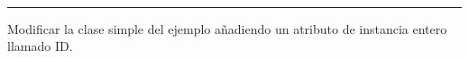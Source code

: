 \documentclass[11pt]{article}
\begin{document}
	\theoremstyle{Tema} \newtheorem{Tema}{Tema} %
	\theoremstyle{Tema} \newtheorem{serie}{Serie}              %
	\theoremstyle{Tema} \newtheorem{ejercicio}{Ejercicio}    %
	
	
	{
		\renewcommand{\headrulewidth}{1pt}
		\fancyhead[L]{ 
		}
	}
	
	{
		\renewcommand{\headrulewidth}{1 pt}
		\fancyhead[R]{
			\emph{\myDoc $-$ \myCourse} %
		}
		\fancyhead[L]{}  
		\fancyfoot[C]{}
		\fancyfoot[R]{\thepage}
	}
	
	\date{}
	\setlength{\headheight}{0.65 in} %
	
	\pagestyle{allStyle}
	
	\thispagestyle{firststyle}
	\begin{center}
		\LARGE
		\textsc{\myDoc}\\\normalsize %
		\medskip
		\hrule height 1pt
	\end{center}
	
	
	\begin{problem}
		Modificar la clase simple del ejemplo añadiendo un atributo de instancia entero llamado ID.
	\end{problem}
\end{document}
